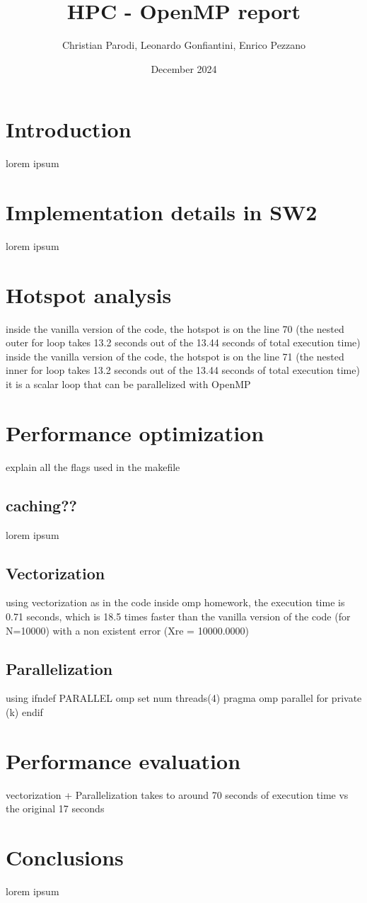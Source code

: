 \documentclass{article}
\title{HPC - OpenMP report}
\author{Christian Parodi, Leonardo Gonfiantini, Enrico Pezzano}
\date{December 2024}
\begin{document}
\maketitle
\tableofcontents

\clearpage

\section{Introduction}
lorem ipsum

\section{Implementation details in SW2}
lorem ipsum

\section{Hotspot analysis}
inside the vanilla version of the code, the hotspot is on the line 70 (the nested outer for loop takes 13.2 seconds out of the 13.44 seconds of total execution time)
inside the vanilla version of the code, the hotspot is on the line 71 (the nested inner for loop takes 13.2 seconds out of the 13.44 seconds of total execution time)
it is a scalar loop that can be parallelized with OpenMP


\section{Performance optimization}
explain all the flags used in the makefile


\subsection{caching??}
lorem ipsum

\subsection{Vectorization}
using vectorization as in the code inside omp homework, the execution time is 0.71 seconds, which is 18.5 times faster than the vanilla version of the code (for N=10000) with a non existent error (Xre = 10000.0000)


\subsection{Parallelization}
using 
   ifndef PARALLEL
      omp set num threads(4)
      pragma omp parallel for private (k)
   endif


\section{Performance evaluation}
vectorization + Parallelization takes to around 70 seconds of execution time vs the original 17 seconds

\section{Conclusions}
lorem ipsum
\end{document}
